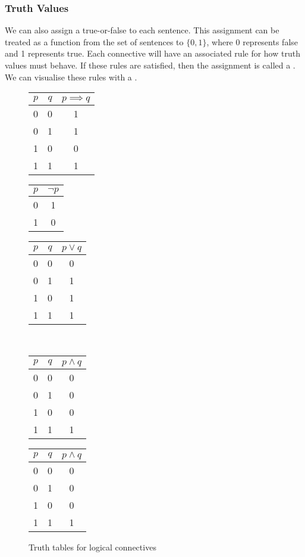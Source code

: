 \documentclass[11pt]{article}
\begin{document}
\subsubsection{Truth Values}
We can also assign a true-or-false  to each sentence. This assignment can be treated as a function from the set of sentences to $\{0, 1 \}$, where 0 represents false and 1 represents true.  Each connective will have an associated rule for how truth values must behave. If these rules are satisfied, then the assignment is called a . We can visualise these rules with a . 
\begin{figure}[H]
    \caption{Truth tables for logical connectives}
    \label{fig:truthTablesLogicalConnectives}
    \centering
    \begin{tabular}{|c|c||c|}
        \hline
        $p$ & $q$ & $p \implies q$ \\ \hline
        0 & 0 & 1 \\
        0 & 1 & 1 \\
        1 & 0 & 0 \\
        1 & 1 & 1 \\ \hline
    \end{tabular}\quad
    \begin{tabular}{|c||c|}
        \hline
        $p$ & $\neg p$  \\ \hline
        0 & 1 \\
        1 & 0 \\\hline
    \end{tabular}\quad
    \begin{tabular}{|c|c||c|}
        \hline
        $p$ & $q$ & $p \lor q$ \\ \hline
        0 & 0 & 0 \\
        0 & 1 & 1 \\
        1 & 0 & 1 \\
        1 & 1 & 1 \\ \hline
    \end{tabular}\\
    \begin{tabular}{|c|c||c|}
        \hline
        $p$ & $q$ & $p \land q$ \\ \hline
        0 & 0 & 0 \\
        0 & 1 & 0 \\
        1 & 0 & 0 \\
        1 & 1 & 1 \\ \hline
    \end{tabular}\quad
    \begin{tabular}{|c|c||c|}
        \hline
        $p$ & $q$ & $p \land q$ \\ \hline
        0 & 0 & 0 \\
        0 & 1 & 0 \\
        1 & 0 & 0 \\
        1 & 1 & 1 \\ \hline
    \end{tabular}
\end{figure}
\end{document}
